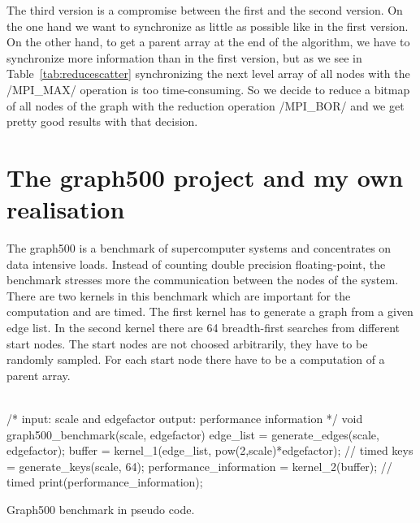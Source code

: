 \documentclass[12pt,a4paper]{article}
\begin{document}
The third version is a compromise between the first and the second version. On the one hand we want to synchronize as little as possible like in the first version. On the other hand, to get a parent array at the end of the algorithm, we have to synchronize more information than in the first version, but as we see in Table~\ref{tab:reducescatter} synchronizing the next level array of all nodes with the \cinline/MPI_MAX/ operation is too time-consuming. So we decide to reduce a bitmap of all nodes of the graph with the reduction operation \cinline/MPI_BOR/ and we get pretty good results with that decision.

\section{The graph500 project and my own realisation}
\label{sec:graph500}

The graph500 \cite{graph500} is a benchmark of supercomputer systems and concentrates on data intensive loads. Instead of counting double precision floating-point, the benchmark stresses more the communication between the nodes of the system. There are two kernels in this benchmark which are important for the computation and are timed. The first kernel has to generate a graph from a given edge list. In the second kernel there are 64 breadth-first searches from different start nodes. The start nodes are not choosed arbitrarily, they have to be randomly sampled. For each start node there have to be a computation of a parent array.\\
\\
\begin{listing}[H]
\begin{ccode}
/*
input: scale and edgefactor
output: performance information
*/
void graph500_benchmark(scale, edgefactor){
	edge_list = generate_edges(scale, edgefactor);
	buffer = kernel_1(edge_list, pow(2,scale)*edgefactor); // timed
	keys = generate_keys(scale, 64);
	performance_information = kernel_2(buffer); // timed
	print(performance_information);
}
\end{ccode}
\caption{Graph500 benchmark in pseudo code.}
\label{lst:graph500}
\end{listing}
\end{document}

